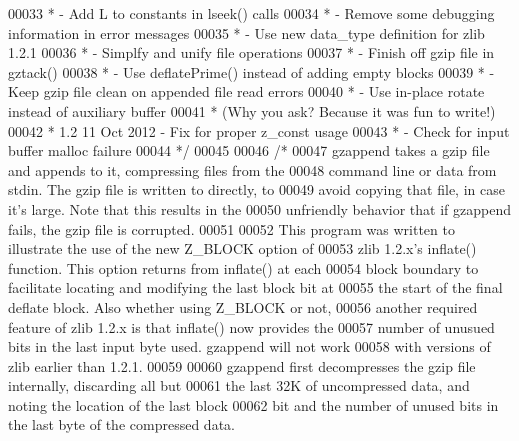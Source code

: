 \begin{DoxyCode}
00033 \textcolor{comment}{ *                      - Add L to constants in lseek() calls}
00034 \textcolor{comment}{ *                      - Remove some debugging information in error messages}
00035 \textcolor{comment}{ *                      - Use new data\_type definition for zlib 1.2.1}
00036 \textcolor{comment}{ *                      - Simplfy and unify file operations}
00037 \textcolor{comment}{ *                      - Finish off gzip file in gztack()}
00038 \textcolor{comment}{ *                      - Use deflatePrime() instead of adding empty blocks}
00039 \textcolor{comment}{ *                      - Keep gzip file clean on appended file read errors}
00040 \textcolor{comment}{ *                      - Use in-place rotate instead of auxiliary buffer}
00041 \textcolor{comment}{ *                        (Why you ask?  Because it was fun to write!)}
00042 \textcolor{comment}{ * 1.2  11 Oct 2012     - Fix for proper z\_const usage}
00043 \textcolor{comment}{ *                      - Check for input buffer malloc failure}
00044 \textcolor{comment}{ */}
00045 
00046 \textcolor{comment}{/*}
00047 \textcolor{comment}{   gzappend takes a gzip file and appends to it, compressing files from the}
00048 \textcolor{comment}{   command line or data from stdin.  The gzip file is written to directly, to}
00049 \textcolor{comment}{   avoid copying that file, in case it's large.  Note that this results in the}
00050 \textcolor{comment}{   unfriendly behavior that if gzappend fails, the gzip file is corrupted.}
00051 \textcolor{comment}{}
00052 \textcolor{comment}{   This program was written to illustrate the use of the new Z\_BLOCK option of}
00053 \textcolor{comment}{   zlib 1.2.x's inflate() function.  This option returns from inflate() at each}
00054 \textcolor{comment}{   block boundary to facilitate locating and modifying the last block bit at}
00055 \textcolor{comment}{   the start of the final deflate block.  Also whether using Z\_BLOCK or not,}
00056 \textcolor{comment}{   another required feature of zlib 1.2.x is that inflate() now provides the}
00057 \textcolor{comment}{   number of unusued bits in the last input byte used.  gzappend will not work}
00058 \textcolor{comment}{   with versions of zlib earlier than 1.2.1.}
00059 \textcolor{comment}{}
00060 \textcolor{comment}{   gzappend first decompresses the gzip file internally, discarding all but}
00061 \textcolor{comment}{   the last 32K of uncompressed data, and noting the location of the last block}
00062 \textcolor{comment}{   bit and the number of unused bits in the last byte of the compressed data.}

\end{DoxyCode}
